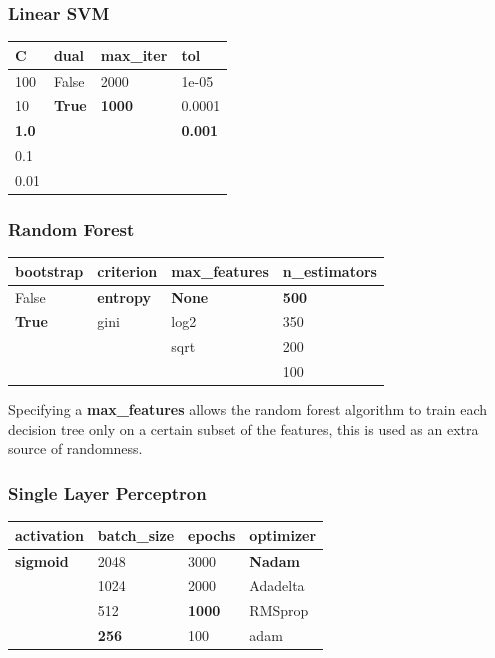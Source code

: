 \documentclass[epsfig,a4paper,11pt,titlepage,twoside,openany]{book}
\begin{document}
\subsubsection{Linear SVM}

\begin{table}[H]
\centering
\begin{tabular}{l|l|l|l}
C            & dual          & max\_iter     & tol            \\ \hline
100          & False         & 2000          & 1e-05          \\
10           & \textbf{True} & \textbf{1000} & 0.0001         \\
\textbf{1.0} &               &               & \textbf{0.001} \\
0.1          &               &               &                \\
0.01         &               &               & 
\end{tabular}
\end{table}


\subsubsection{Random Forest}

\begin{table}[H]
\centering
\begin{tabular}{l|l|l|l}
bootstrap     & criterion        & max\_features & n\_estimators \\ \hline
False         & \textbf{entropy} & \textbf{None} & \textbf{500}  \\
\textbf{True} & gini             & log2          & 350           \\
              &                  & sqrt          & 200           \\
              &                  &               & 100          
\end{tabular}
\end{table}

Specifying a \textbf{max\_features} allows the random forest algorithm to train each decision tree only on a certain subset of the features, this is used as an extra source of randomness.

\subsubsection{Single Layer Perceptron}

\begin{table}[H]
\centering
\begin{tabular}{l|l|l|l}
activation       & batch\_size  & epochs        & optimizer      \\ \hline
\textbf{sigmoid} & 2048         & 3000          & \textbf{Nadam} \\
                 & 1024         & 2000          & Adadelta       \\
                 & 512          & \textbf{1000} & RMSprop        \\
                 & \textbf{256} & 100           & adam     
\end{tabular}
\end{table}
\end{document}
